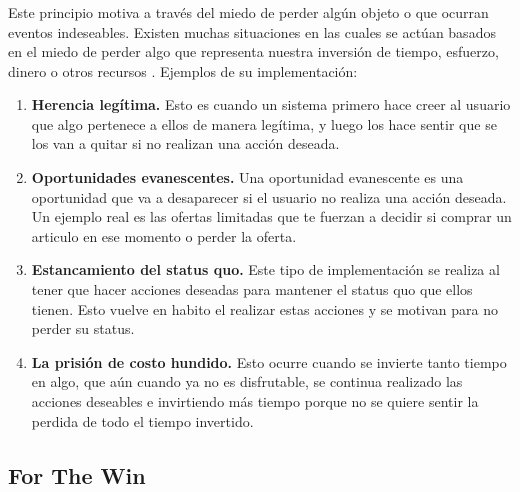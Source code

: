 \subsubsection{\principioVIII} \label{subsec:principioVIII}

 Este principio motiva a través del miedo de perder algún objeto o que ocurran eventos indeseables.
 Existen muchas situaciones en las cuales se actúan basados en el miedo de perder algo que representa
 nuestra inversión de tiempo, esfuerzo, dinero o otros recursos \cite{Octalysis}. Ejemplos de su
 implementación:
        
    \begin{enumerate}
    \item \textbf{Herencia legítima.}\cite{Octalysis}
        Esto es cuando un sistema primero hace creer al usuario que algo pertenece a ellos de manera
        legítima, y luego los hace sentir que se los van a quitar si no realizan una acción deseada.
            
    \item \textbf{Oportunidades evanescentes.}\cite{Octalysis}
        Una oportunidad evanescente es una oportunidad que va a desaparecer si el usuario no
        realiza una acción deseada. Un ejemplo real es las ofertas limitadas que te fuerzan
        a decidir si comprar un articulo en ese momento o perder la oferta.
            
    \item \textbf{Estancamiento del status quo.}\cite{Octalysis}
        Este tipo de implementación se realiza al tener que hacer acciones deseadas para
        mantener el status quo que ellos tienen. Esto vuelve en habito el realizar estas
        acciones y se motivan para no perder su status.
            
    \item \textbf{La prisión de costo hundido.}\cite{Octalysis}
        Esto ocurre cuando se invierte tanto tiempo en algo, que aún cuando ya no es disfrutable,
        se continua realizado las acciones deseables e invirtiendo más tiempo porque no se quiere
        sentir la perdida de todo el tiempo invertido.
            
    \end{enumerate}
    
\clearpage


\subsection{For The Win} \label{sec:ForTheWin}


